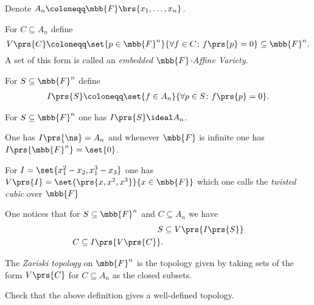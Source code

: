\documentclass[10pt,a4paper,twoside,openany,hidelinks]{book}
\begin{document}
\begin{notation}
Denote $A_n \coloneqq \mbb{F}\brs{x_1, \ldots, x_n}$.
\end{notation}

\begin{definition}
For $C \subseteq A_n$ define
\[V\prs{C} \coloneqq \set{p \in \mbb{F}^n}{\forall f \in C \colon f\prs{p} = 0} \subseteq \mbb{F}^n \text{.}\]
A set of this form is called an \emph{embedded $\mbb{F}$-Affine Variety}.
\end{definition}

\begin{definition}
For $S \subseteq \mbb{F}^n$ define
\begin{align*}
I\prs{S} \coloneqq \set{f \in A_n}{\forall p \in S \colon f\prs{p} = 0} \text{.}
\end{align*}
\end{definition}

\begin{exercise}
For $S \subseteq \mbb{F}^n$ one has $I\prs{S} \ideal A_n$.
\end{exercise}

\begin{example}
One has $I\prs{\ns} = A_n$ and whenever $\mbb{F}$ is infinite one has $I\prs{\mbb{F}^n} = \set{0}$.
\end{example}

\begin{example}
For $I = \set{x_1^2 - x_2, x_1^3 - x_3}$ one has $V\prs{I} = \set{\prs{x, x^2, x^3}}{x \in \mbb{F}}$ which one calls the \emph{twisted cubic} over $\mbb{F}$
\end{example}

\begin{proposition}
One notices that for $S \subseteq \mbb{F}^n$ and $C \subseteq A_n$ we have
\begin{align*}
S &\subseteq V\prs{I\prs{S}} \\
C \subseteq I\prs{V\prs{C}} \text{.}
\end{align*}
\end{proposition}

\begin{definition}
The \emph{Zariski topology} on $\mbb{F}^n$ is the topology given by taking sets of the form $V\prs{C}$ for $C \subseteq A_n$ as the closed subsets.
\end{definition}

\begin{exercise}
Check that the above definition gives a well-defined topology.
\end{exercise}
\end{document}
